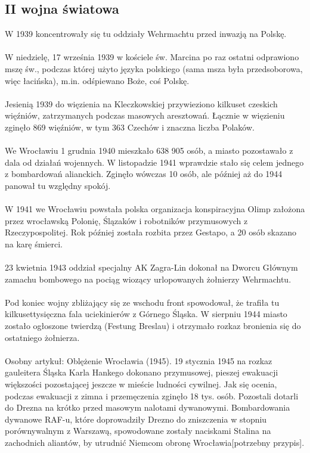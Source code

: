 \documentclass{article}
\begin{document}
\subsection{II wojna światowa}
W 1939 koncentrowały się tu oddziały Wehrmachtu przed inwazją na Polskę.\\
\\
W niedzielę, 17 września 1939 w kościele św. Marcina po raz ostatni odprawiono mszę św., podczas której użyto języka polskiego (sama msza była przedsoborowa, więc łacińska), m.in. odśpiewano Boże, coś Polskę.\\
\\
Jesienią 1939 do więzienia na Kleczkowskiej przywieziono kilkuset czeskich więźniów, zatrzymanych podczas masowych aresztowań. Łącznie w więzieniu zginęło 869 więźniów, w tym 363 Czechów i znaczna liczba Polaków.\\
\\
We Wrocławiu 1 grudnia 1940 mieszkało 638 905 osób, a miasto pozostawało z dala od działań wojennych. W listopadzie 1941 wprawdzie stało się celem jednego z bombardowań alianckich. Zginęło wówczas 10 osób, ale później aż do 1944 panował tu względny spokój.\\
\\
W 1941 we Wrocławiu powstała polska organizacja konspiracyjna Olimp założona przez wrocławską Polonię, Ślązaków i robotników przymusowych z Rzeczypospolitej. Rok później została rozbita przez Gestapo, a 20 osób skazano na karę śmierci.\\
\\
23 kwietnia 1943 oddział specjalny AK Zagra-Lin dokonał na Dworcu Głównym zamachu bombowego na pociąg wiozący urlopowanych żołnierzy Wehrmachtu.\\
\\
Pod koniec wojny zbliżający się ze wschodu front spowodował, że trafiła tu kilkusettysięczna fala uciekinierów z Górnego Śląska. W sierpniu 1944 miasto zostało ogłoszone twierdzą (Festung Breslau) i otrzymało rozkaz bronienia się do ostatniego żołnierza.\\
\\
 Osobny artykuł: Oblężenie Wrocławia (1945).
19 stycznia 1945 na rozkaz gauleitera Śląska Karla Hankego dokonano przymusowej, pieszej ewakuacji większości pozostającej jeszcze w mieście ludności cywilnej. Jak się ocenia, podczas ewakuacji z zimna i przemęczenia zginęło 18 tys. osób. Pozostali dotarli do Drezna na krótko przed masowym nalotami dywanowymi. Bombardowania dywanowe RAF-u, które doprowadziły Drezno do zniszczenia w stopniu porównywalnym z Warszawą, spowodowane zostały naciskami Stalina na zachodnich aliantów, by utrudnić Niemcom obronę Wrocławia[potrzebny przypis].\\
\end{document}
